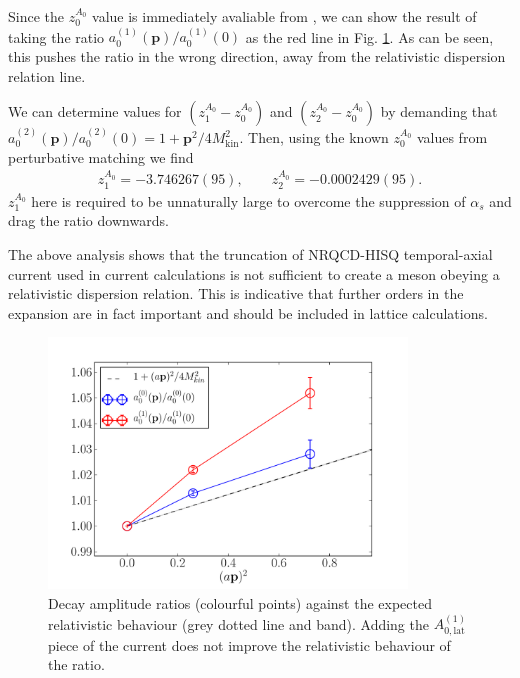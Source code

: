 Since the $z_0^{A_0}$ value is immediately avaliable from \cite{Monahan:2012dq}, we can show the result of taking the ratio $a_0^{(1)}({\textbf{p}})/a_0^{(1)}(0)$ as the red line in Fig. \ref{fig:relativisticnorm}. As can be seen, this pushes the ratio in the wrong direction, away from the relativistic dispersion relation line.

  We can determine values for $\left(z_1^{A_0}-z_0^{A_0}\right)$ and $\left(z_2^{A_0}-z_0^{A_0}\right)$ by demanding that $a^{(2)}_0({\textbf{p}})/a^{(2)}_0(0) = 1 + {\textbf{p}}^2/4M_{\text{kin}}^2$. Then, using the known $z_0^{A_0}$ values from perturbative matching we find
  \begin{align}
    z_1^{A_0} = -3.746267(95),\quad\quad z_2^{A_0} = -0.0002429(95).
  \end{align}
  $z_1^{A_0}$ here is required to be unnaturally large to overcome the suppression of $\alpha_s$ and drag the ratio downwards. 

The above analysis shows that the truncation of NRQCD-HISQ temporal-axial current used in current calculations is not sufficient to create a meson obeying a relativistic dispersion relation. This is indicative that further orders in the expansion are in fact important and should be included in lattice calculations. 

\begin{figure}[htp!]
  \begin{center}
    \includegraphics[width=0.85\textwidth]{images/nrqcd/relativistic_normalization_J0J1.pdf}
  \end{center}
  \caption{Decay amplitude ratios (colourful points) against the expected relativistic behaviour (grey dotted line and band). Adding the $A_{0,\text{lat}}^{(1)}$ piece of the current does not improve the relativistic behaviour of the ratio. \label{fig:relativisticnorm}}
\end{figure}

